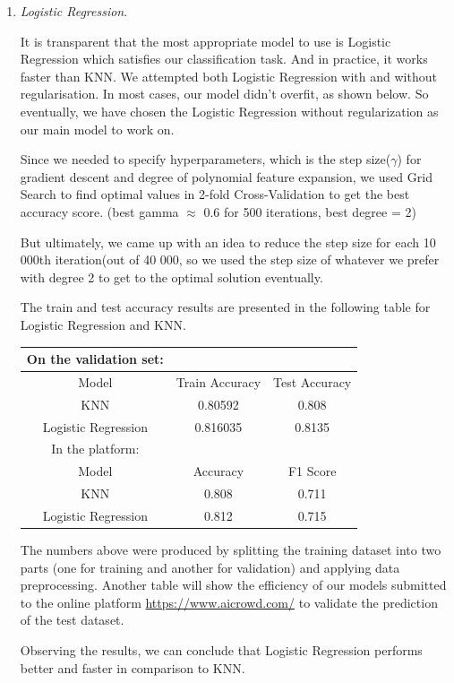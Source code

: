 \documentclass[10pt,conference,compsocconf]{IEEEtran}
\begin{document}
\begin{enumerate}
\item {\textit{Logistic Regression}.}

It is transparent that the most appropriate model to use is Logistic Regression which satisfies our classification task. And in practice, it works faster than KNN. 
We attempted both Logistic Regression with and without regularisation. In most cases, our model didn't overfit, as shown below. So eventually, we have chosen the Logistic Regression without regularization as our main model to work on.

Since we needed to specify hyperparameters, which is the step size($\gamma$) for gradient descent and degree of polynomial feature expansion, we used Grid Search to find optimal values in 2-fold Cross-Validation to get the best accuracy score. (best gamma $\approx$ 0.6 for 500 iterations, best degree = 2)

But ultimately, we came up with an idea to reduce the step size for each 10 000th iteration(out of 40 000, so we used the step size of whatever we prefer with degree 2 to get to the optimal solution eventually.

The train and test accuracy results are presented in the following table for Logistic Regression and KNN.

\begin{center}
\begin{tabular}{||c c c||} 
 \hline On the validation set: \\ \hline\hline
 Model & Train Accuracy & Test Accuracy \\ [0.5ex] 
 \hline\hline
 KNN & 0.80592 & 0.808 \\ 
  Logistic Regression & 0.816035 & 0.8135 \\ 
  \hline
 \hline In the platform: \\ \hline\hline
  Model & Accuracy & F1 Score \\ [0.5ex] 
  \hline\hline
  KNN & 0.808 & 0.711 \\ 
  Logistic Regression & 0.812 & 0.715 \\ 
  \hline
 \end{tabular}
\end{center}
\hfill \break
The numbers above were produced by splitting the training dataset into two parts (one for training and another for validation) and applying data preprocessing.
Another table will show the efficiency of our models submitted to the online platform \href{AICrowd}{https://www.aicrowd.com/} to validate the prediction of the test dataset.

Observing the results, we can conclude that Logistic Regression performs better and faster in comparison to KNN.
\end{enumerate}
\end{document}
